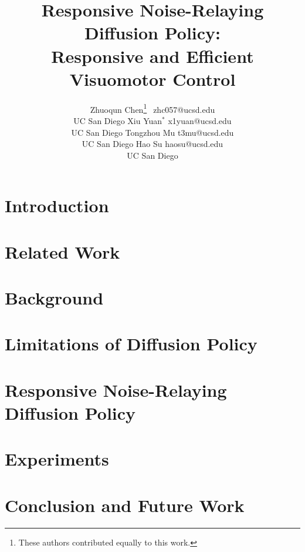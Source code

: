 \documentclass[10pt]{article}
\title{Responsive Noise-Relaying Diffusion Policy:\\Responsive and Efficient Visuomotor Control}
\author{\name Zhuoqun Chen\thanks{These authors contributed equally to this work.}$\;\,$ \email zhc057@ucsd.edu \\
      \addr UC San Diego
      \AND
      \name Xiu Yuan$^*$ \email x1yuan@ucsd.edu \\
      \addr UC San Diego
      \AND
      \name Tongzhou Mu \email t3mu@ucsd.edu \\
      \addr UC San Diego
      \AND
      \name Hao Su \email haosu@ucsd.edu \\
      \addr UC San Diego}
\begin{document}
\maketitle

\begin{abstract}
    
\end{abstract}

\section{Introduction} \label{sec:intro}


\section{Related Work} \label{sec:related}


\section{Background} \label{sec:background}


\section{Limitations of Diffusion Policy} \label{sec:limitations}


\section{Responsive Noise-Relaying Diffusion Policy} \label{sec:method}


\section{Experiments} \label{sec:experiment}


\section{Conclusion and Future Work} \label{sec:conclusion}


\newpage



\newpage
\appendix

\end{document}
